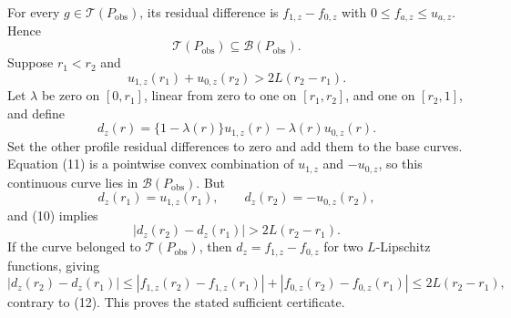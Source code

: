 For every \(g\in\mathcal T(P_{\mathrm{obs}})\), its residual difference is \(f_{1,z}-f_{0,z}\) with \(0\leq f_{a,z}\leq u_{a,z}\).  Hence
\[
\mathcal T(P_{\mathrm{obs}})\subseteq\mathcal B(P_{\mathrm{obs}}).
\tag{9}
\]
Suppose \(r_1<r_2\) and
\[
u_{1,z}(r_1)+u_{0,z}(r_2)>2L(r_2-r_1).
\tag{10}
\]
Let \(\lambda\) be zero on \([0,r_1]\), linear from zero to one on \([r_1,r_2]\), and one on \([r_2,1]\), and define
\[
d_z(r)=\{1-\lambda(r)\}u_{1,z}(r)-\lambda(r)u_{0,z}(r).
\tag{11}
\]
Set the other profile residual differences to zero and add them to the base curves.  Equation (11) is a pointwise convex combination of \(u_{1,z}\) and \(-u_{0,z}\), so this continuous curve lies in \(\mathcal B(P_{\mathrm{obs}})\).  But
\[
d_z(r_1)=u_{1,z}(r_1),\qquad
d_z(r_2)=-u_{0,z}(r_2),
\]
and (10) implies
\[
|d_z(r_2)-d_z(r_1)|>2L(r_2-r_1).
\tag{12}
\]
If the curve belonged to \(\mathcal T(P_{\mathrm{obs}})\), then \(d_z=f_{1,z}-f_{0,z}\) for two \(L\)-Lipschitz functions, giving
\[
|d_z(r_2)-d_z(r_1)|
\leq|f_{1,z}(r_2)-f_{1,z}(r_1)|
+|f_{0,z}(r_2)-f_{0,z}(r_1)|
\leq2L(r_2-r_1),
\]
contrary to (12).  This proves the stated sufficient certificate.
